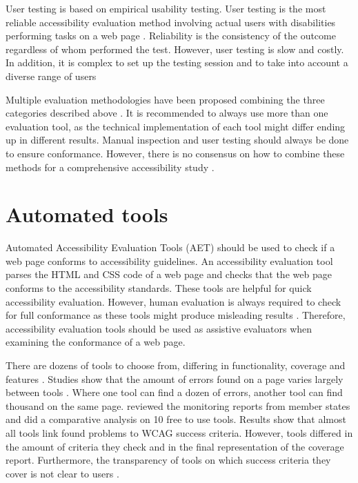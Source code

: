 User testing is based on empirical usability testing. User testing is the most reliable accessibility evaluation method involving actual users with disabilities performing tasks on a web page \citep[Chapter~26.2]{webaccessibility}. Reliability is the consistency of the outcome regardless of whom performed the test. However, user testing is slow and costly. In addition, it is complex to set up the testing session and to take into account a diverse range of users \citep{comparative_accessibility_methods}

Multiple evaluation methodologies have been proposed combining the three categories described above \citep[Chapter~26.2.1]{webaccessibility}. It is recommended to always use more than one evaluation tool, as the technical implementation of each tool might differ ending up in different results. Manual inspection and user testing should always be done to ensure conformance. However, there is no consensus on how to combine these methods for a comprehensive accessibility study \citep[Chapter~26.2.1]{webaccessibility}.

\section{Automated tools\label{automated_tools}}

Automated Accessibility Evaluation Tools (AET) should be used to check if a web page conforms to accessibility guidelines. An accessibility evaluation tool parses the HTML and CSS code of a web page and checks that the web page conforms to the accessibility standards. These tools are helpful for quick accessibility evaluation. However, human evaluation is always required to check for full conformance as these tools might produce misleading results \citep{wcagevaluationtools}. Therefore, accessibility evaluation tools should be used as assistive evaluators when examining the conformance of a web page.

There are dozens of tools to choose from, differing in functionality, coverage and features \citep{tool_list}. Studies show that the amount of errors found on a page varies largely between tools \citep{comparison_10.1145/3371300.3383346, comparison_10.1145/3607720.3607722, tool_analysis_directive}. Where one tool can find a dozen of errors, another tool can find thousand on the same page. \textcite{tool_analysis_directive} reviewed the monitoring reports from member states and did a comparative analysis on 10 free to use tools. Results show that almost all tools link found problems to WCAG success criteria. However, tools differed in the amount of criteria they check and in the final representation of the coverage report. Furthermore, the transparency of tools on which success criteria they cover is not clear to users \citep{tool_analysis_directive}.

